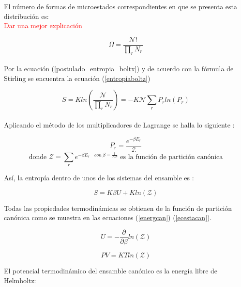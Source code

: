 El número de formas de microestados correspondientes en que se presenta esta distribución es:\\ \textcolor{red}{Dar una mejor explicación}

\begin{equation} \label{ditrbmicro}
    \Omega = \frac{\mathcal{N}!}{\prod_r N_r}
\end{equation}\\

Por la ecuación (\ref{postulado_entropia_boltx}) y de acuerdo con la fórmula de Stirling se encuentra la ecuación (\ref{entropiaboltz})

\begin{equation}  \label{entropiaboltz}
    S = Kln(\frac{\mathcal{N}}{\prod_r N_r}) = -K\mathcal{N}\sum_r P_rln(P_r)
\end{equation}\\

Aplicando el método de los multiplicadores de Lagrange se halla lo siguiente \cite{greiner1995}:

\begin{equation} \label{probcan}
    P_r = \frac{e^{-\beta E_r}}{\mathcal{Z}}
\end{equation}
\begin{equation*} \label{funcpartcan}
    \text{donde }\mathcal{Z} = \sum_r e^{-\beta E_r \quad con\ \beta=\frac{1}{KT}} \text{ es la función de partición canónica}
\end{equation*}


Así, la entropía dentro de unos de los sistemas del ensamble es \cite{mandl1988statistical}:

\begin{equation} \label{entrnvt}
    S = K\beta U + Kln(\mathcal{Z})
\end{equation}

Todas las propiedades termodinámicas se obtienen de la función de partición canónica como se muestra en las ecuaciones (\ref{energcan}) (\ref{ecestacan}).

\begin{equation} \label{energcan}
    U=-\frac{\partial}{\partial \beta}ln(\mathcal{Z})
\end{equation}

\begin{equation} \label{ecestacan}
    PV=KTln(\mathcal{Z})
\end{equation}

El potencial termodinámico del ensamble canónico es la energía libre de Helmholtz:

